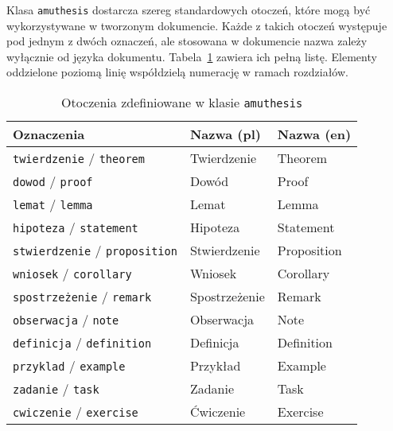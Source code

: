 \documentclass[oneside,polski]{amuthesis}
\begin{document}
Klasa \texttt{amuthesis} dostarcza szereg standardowych otoczeń, które mogą być wykorzystywane w tworzonym dokumencie. Każde z takich otoczeń występuje pod jednym z dwóch oznaczeń, ale stosowana w dokumencie nazwa zależy wyłącznie od języka dokumentu. Tabela~\ref{table:amuthesis-otoczenia} zawiera ich pełną listę. Elementy oddzielone poziomą linię współdzielą numerację w ramach rozdziałów.

\begin{table}[p]
  \caption{Otoczenia zdefiniowane w klasie \texttt{amuthesis}}
  \label{table:amuthesis-otoczenia}
  \begin{center}
  \begin{tabular}{lll}
    \toprule
    Oznaczenia & Nazwa (pl) & Nazwa (en)\\
    \midrule
    \texttt{twierdzenie} / \texttt{theorem} & Twierdzenie & Theorem\\
    \texttt{dowod} / \texttt{proof} & Dowód & Proof\\
    \texttt{lemat} / \texttt{lemma} & Lemat & Lemma\\
    \texttt{hipoteza} / \texttt{statement} & Hipoteza & Statement\\
    \texttt{stwierdzenie} / \texttt{proposition} & Stwierdzenie & Proposition\\
    \texttt{wniosek} / \texttt{corollary} & Wniosek & Corollary\\
    \texttt{spostrzeżenie} / \texttt{remark} & Spostrzeżenie & Remark\\
    \texttt{obserwacja} / \texttt{note} & Obserwacja & Note\\
    \midrule
    \texttt{definicja} / \texttt{definition} & Definicja & Definition\\
    \midrule
    \texttt{przyklad} / \texttt{example} & Przykład & Example\\
    \midrule
    \texttt{zadanie} / \texttt{task} & Zadanie & Task\\
    \texttt{cwiczenie} / \texttt{exercise} & Ćwiczenie & Exercise\\
    \bottomrule
  \end{tabular}
  \end{center}
\end{table}
\end{document}
